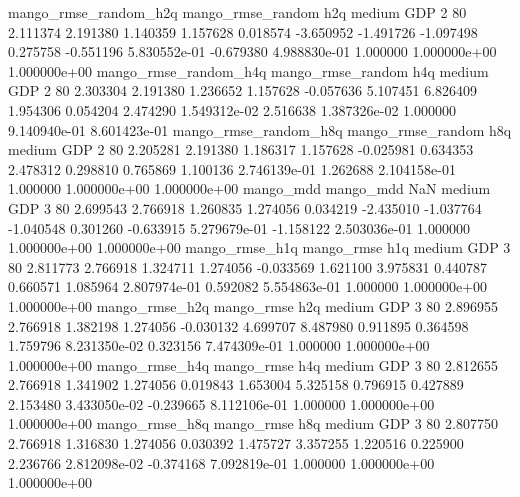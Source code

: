 mango_rmse_random_h2q mango_rmse_random                  h2q     medium      GDP                 2 80  2.111374       2.191380 1.140359       1.157628    0.018574     -3.650952     -1.491726    -1.097498       0.275758 -0.551196 5.830552e-01    -0.679380   4.988830e-01            1.000000    1.000000e+00        1.000000e+00
mango_rmse_random_h4q mango_rmse_random                  h4q     medium      GDP                 2 80  2.303304       2.191380 1.236652       1.157628   -0.057636      5.107451      6.826409     1.954306       0.054204  2.474290 1.549312e-02     2.516638   1.387326e-02            1.000000    9.140940e-01        8.601423e-01
mango_rmse_random_h8q mango_rmse_random                  h8q     medium      GDP                 2 80  2.205281       2.191380 1.186317       1.157628   -0.025981      0.634353      2.478312     0.298810       0.765869  1.100136 2.746139e-01     1.262688   2.104158e-01            1.000000    1.000000e+00        1.000000e+00
            mango_mdd         mango_mdd                  NaN     medium      GDP                 3 80  2.699543       2.766918 1.260835       1.274056    0.034219     -2.435010     -1.037764    -1.040548       0.301260 -0.633915 5.279679e-01    -1.158122   2.503036e-01            1.000000    1.000000e+00        1.000000e+00
       mango_rmse_h1q        mango_rmse                  h1q     medium      GDP                 3 80  2.811773       2.766918 1.324711       1.274056   -0.033569      1.621100      3.975831     0.440787       0.660571  1.085964 2.807974e-01     0.592082   5.554863e-01            1.000000    1.000000e+00        1.000000e+00
       mango_rmse_h2q        mango_rmse                  h2q     medium      GDP                 3 80  2.896955       2.766918 1.382198       1.274056   -0.030132      4.699707      8.487980     0.911895       0.364598  1.759796 8.231350e-02     0.323156   7.474309e-01            1.000000    1.000000e+00        1.000000e+00
       mango_rmse_h4q        mango_rmse                  h4q     medium      GDP                 3 80  2.812655       2.766918 1.341902       1.274056    0.019843      1.653004      5.325158     0.796915       0.427889  2.153480 3.433050e-02    -0.239665   8.112106e-01            1.000000    1.000000e+00        1.000000e+00
       mango_rmse_h8q        mango_rmse                  h8q     medium      GDP                 3 80  2.807750       2.766918 1.316830       1.274056    0.030392      1.475727      3.357255     1.220516       0.225900  2.236766 2.812098e-02    -0.374168   7.092819e-01            1.000000    1.000000e+00        1.000000e+00
